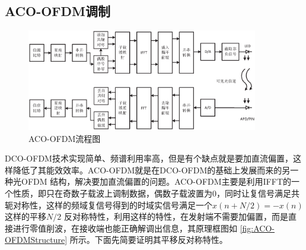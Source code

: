 \subsection{ACO-OFDM调制}

\begin{figure}[h]
    \centering
    \includegraphics[width=0.9\textwidth]{figures/Chapter-2/ACO-OFDMStructure.eps}
    \caption{ACO-OFDM流程图}
    \label{fig:ACO-OFDMStructure}
\end{figure}
DCO-OFDM技术实现简单、频谱利用率高，但是有个缺点就是要加直流偏置，这样降低了其能效效率。ACO-OFDM就是在DCO-OFDM的基础上发展而来的另一种光OFDM 结构，解决要加直流偏置的问题。ACO-OFDM主要是利用IFFT的一个性质，即只在奇数子载波上调制数据，偶数子载波置为0，同时让复信号满足共轭对称性，这样的频域复信号得到的时域实信号满足一个$x(n+N/2)=-x(n)$这样的平移$N/2$ 反对称特性，利用这样的特性，在发射端不需要加偏置，而是直接进行零值削波，在接收端也能正确解调出信息，其原理框图如
\autoref{fig:ACO-OFDMStructure} 所示。下面先简要证明其平移反对称特性。

